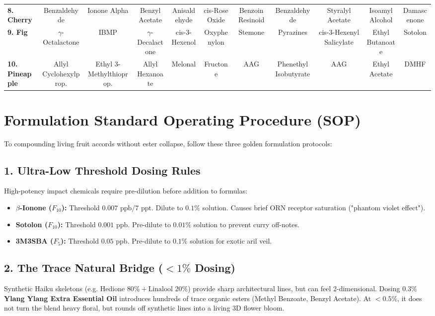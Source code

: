 \documentclass[11pt,a4paper]{article}
\begin{document}
\begin{landscape}
\begin{table}[htbp]
{\begin{tabular}{l cccccccccc}
\textbf{8. Cherry} & Benzaldehyde & Ionone Alpha & Benzyl Acetate & Anisaldehyde & cis-Rose Oxide & Benzoin Resinoid & Benzaldehyde & Styralyl Acetate & Isoamyl Alcohol & Damascenone \\
\textbf{9. Fig} & $\gamma$-Octalactone & IBMP & $\gamma$-Decalactone & cis-3-Hexenol & Oxyphenylon & Stemone & Pyrazines & cis-3-Hexenyl Salicylate & Ethyl Butanoate & Sotolon \\
\textbf{10. Pineapple} & Allyl Cyclohexylprop. & Ethyl 3-Methylthioprop. & Allyl Hexanoate & Melonal & Fructone & AAG & Phenethyl Isobutyrate & AAG & Ethyl Acetate & DMHF \\
\bottomrule
\end{tabular}%
}
\end{table}

\end{landscape}

\newpage

\section{Formulation Standard Operating Procedure (SOP)}

To compounding living fruit accords without ester collapse, follow these three golden formulation protocols:

\subsection{1. Ultra-Low Threshold Dosing Rules}
High-potency impact chemicals require pre-dilution before addition to formulas:
\begin{itemize}[leftmargin=1.5em]
    \item \textbf{\texorpdfstring{$\beta$-Ionone}{beta-Ionone} ($F_{10}$):} Threshold $0.007\text{ ppb} / 7\text{ ppt}$. Dilute to $0.1\%$ solution. Causes brief ORN receptor saturation ("phantom violet effect").
    \item \textbf{Sotolon ($F_{10}$):} Threshold $0.001\text{ ppb}$. Pre-dilute to $0.01\%$ solution to prevent curry off-notes.
    \item \textbf{3M3SBA ($F_5$):} Threshold $0.05\text{ ppb}$. Pre-dilute to $0.1\%$ solution for exotic aril veil.
\end{itemize}

\subsection{2. The Trace Natural Bridge (\texorpdfstring{$<1\%$}{<1\%} Dosing)}
Synthetic Haiku skeletons (e.g. Hedione $80\% + \text{Linalool } 20\%$) provide sharp architectural lines, but can feel 2-dimensional. Dosing \textbf{$0.3\%$ Ylang Ylang Extra Essential Oil} introduces hundreds of trace organic esters (Methyl Benzoate, Benzyl Acetate). At $<0.5\%$, it does not turn the blend heavy floral, but rounds off synthetic lines into a living 3D flower bloom.
\end{document}
